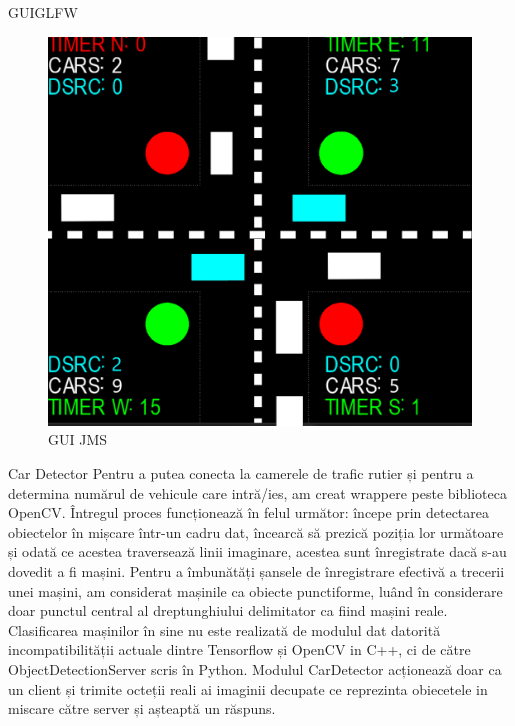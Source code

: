 \documentclass{beamer}
\begin{document}
    \begin{frame}{GUIGLFW}
        \begin{figure}[h!]
            \includegraphics[width=(\textwidth / 3) * 2]{running/GUI_JMS.png}
            \caption{GUI JMS}
            \label{fig:GUI JMS}
        \end{figure}

    \end{frame}
    \begin{frame}{Car Detector}
        Pentru a putea conecta la camerele de trafic rutier și pentru a
        determina numărul de vehicule care intră/ies, am creat wrappere peste
        biblioteca OpenCV. Întregul proces funcționează în felul următor:
        începe prin detectarea obiectelor în mișcare într-un cadru dat,
        încearcă să prezică poziția lor următoare și odată ce acestea
        traversează linii imaginare, acestea sunt înregistrate dacă s-au
        dovedit a fi mașini. Pentru a îmbunătăți șansele de
        înregistrare efectivă a trecerii unei mașini, am considerat
        mașinile ca obiecte punctiforme, luând în considerare doar punctul
        central al dreptunghiului delimitator ca fiind mașini reale.
        Clasificarea mașinilor în sine nu este realizată de modulul dat
        datorită incompatibilității actuale dintre Tensorflow și
        OpenCV in C++, ci de către ObjectDetectionServer scris în Python.
        Modulul CarDetector acționează doar ca un client și trimite
        octeții reali ai imaginii decupate ce reprezinta obiecetele 
        in miscare către server și așteaptă un răspuns.
    \end{frame}
\end{document}
